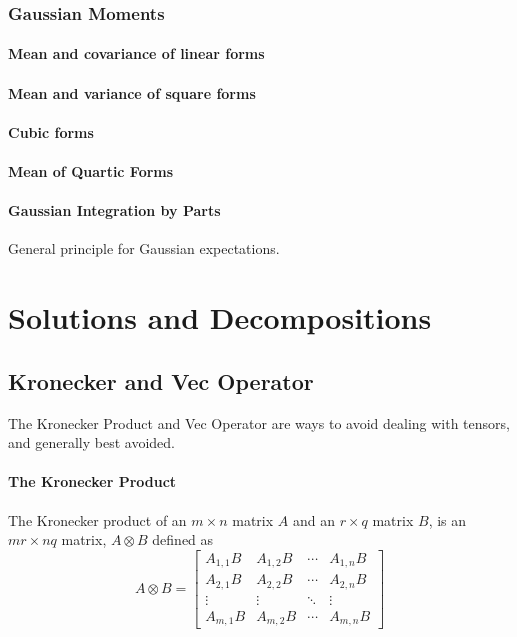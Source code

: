 \documentclass[oneside]{book}
\begin{document}
\subsection{Gaussian Moments}
\subsubsection{Mean and covariance of linear forms}
\subsubsection{Mean and variance of square forms}
\subsubsection{Cubic forms}
\subsubsection{Mean of Quartic Forms}
\subsubsection{Gaussian Integration by Parts}
General principle for Gaussian expectations.



\chapter{Solutions and Decompositions}


\section{Kronecker and Vec Operator}

The Kronecker Product and Vec Operator are ways to avoid dealing with tensors, and generally best avoided.

\subsubsection{The Kronecker Product}
The Kronecker product of an $m\times n$ matrix $A$ and an $r \times q$ matrix $B$, is an $mr \times nq$ matrix, $A \otimes B$ defined as
\[
   A \otimes B = \begin{bmatrix}
      A_{1,1} B & A_{1,2} B & \cdots & A_{1,n} B \\
      A_{2,1} B & A_{2,2} B & \cdots & A_{2,n} B \\
      \vdots & \vdots & \ddots & \vdots \\
      A_{m,1} B & A_{m,2} B & \cdots & A_{m,n} B
   \end{bmatrix}
\]
\end{document}

